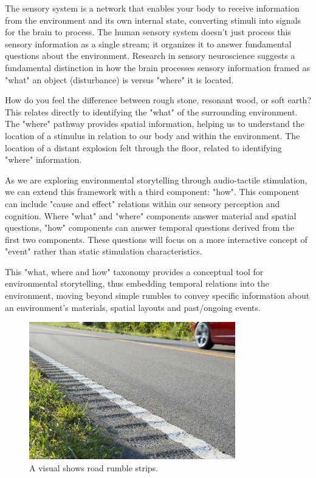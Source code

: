             The sensory system is a network that enables your body to receive information from the environment and its own internal state, converting stimuli into signals for the brain to process. The human sensory system doesn't just process this sensory information as a single stream; it organizes it to answer fundamental questions about the environment\cite{What_vs_Where_in_Touch}. Research in sensory neuroscience suggests a fundamental distinction in how the brain processes sensory information framed as "what" an object (disturbance) is versus "where" it is located.\par

            How do you feel the difference between rough stone, resonant wood, or soft earth? This relates directly to identifying the "what" of the surrounding environment. The "where" pathway provides spatial information, helping us to understand the location of a stimulus in relation to our body and within the environment. The location of a distant explosion felt through the floor, related to identifying "where" information.\par

            As we are exploring environmental storytelling through audio-tactile stimulation, we can extend this framework with a third component: "how". This component can include "cause and effect" relations within our sensory perception and cognition. Where "what" and "where" components answer material and spatial questions, "how" components can answer temporal questions derived from the first two components. These questions will focus on a more interactive concept of "event" rather than static stimulation characteristics.\par

            This "what, where and how" taxonomy provides a conceptual tool for environmental storytelling, thus embedding temporal relations into the environment, moving beyond simple rumbles to convey specific information about an environment's materials, spatial layouts and past/ongoing events.\par

            \begin{figure}[H]
                \centering
                \includegraphics[width=0.8\textwidth]{images/rumble_strips.jpg}
                \caption{A visual shows road rumble strips.}
                \label{fig:RUMBLE_STRIP}
            \end{figure}

